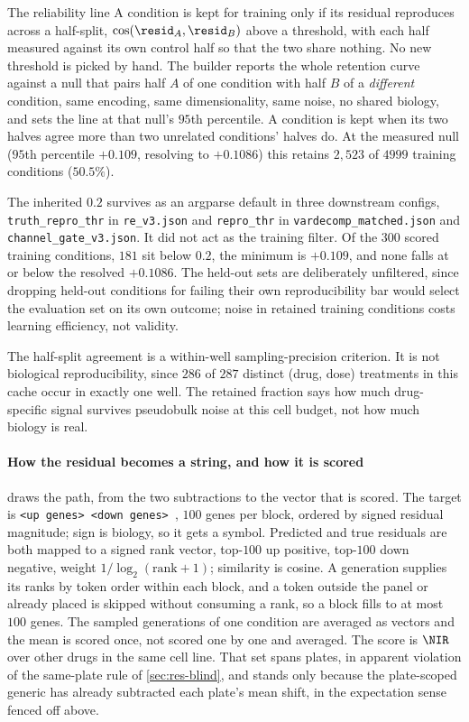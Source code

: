 \begin{defn}{The reliability line}
A condition is kept for training only if its residual reproduces across a
half-split, $\cos(\resid_A, \resid_B)$ above a threshold, with each half
measured against its own control half so that the two share nothing. No new
threshold is picked by hand. The builder reports the whole retention curve
against a null that pairs half $A$ of one condition with half $B$ of a
\emph{different} condition, same encoding, same dimensionality, same noise, no
shared biology, and sets the line at that null's $95$th percentile. A condition
is kept when its two halves agree more than two unrelated conditions' halves do.
At the measured null ($95$th percentile $+0.109$, resolving to $+0.1086$) this
retains $2{,}523$ of $\num{4999}$ training conditions ($50.5\%$).
\end{defn}

The inherited $0.2$ survives as an argparse default in three downstream configs,
\texttt{truth\_repro\_thr} in \texttt{re\_v3.json} and \texttt{repro\_thr} in
\texttt{vardecomp\_matched.json} and \texttt{channel\_gate\_v3.json}. It did not
act as the training filter. Of the $\num{300}$ scored training conditions,
$\num{181}$ sit below $0.2$, the minimum is $+0.109$, and none falls at or below
the resolved $+0.1086$. The held-out sets are deliberately unfiltered, since
dropping held-out conditions for failing their own reproducibility bar would
select the evaluation set on its own outcome; noise in retained training
conditions costs learning efficiency, not validity.

The half-split agreement is a within-well sampling-precision criterion. It is not
biological reproducibility, since $\num{286}$ of $\num{287}$ distinct (drug,
dose) treatments in this cache occur in exactly one well. The retained fraction
says how much drug-specific signal survives pseudobulk noise at this cell budget,
not how much biology is real.

\paragraph{How the residual becomes a string, and how it is scored}
 draws the path, from the two subtractions to the vector that is
scored. The target is \texttt{<up genes> \DOWN{} <down genes> \ENDCELL}, $100$
genes per block, ordered by signed residual magnitude; sign is biology, so it
gets a symbol.
Predicted and true residuals are both mapped to a signed rank vector, top-$100$
up positive, top-$100$ down negative, weight $1/\log_2(\textrm{rank}+1)$;
similarity is cosine. A generation supplies its ranks by token order within each
block, and a token outside the panel or already placed is skipped without
consuming a rank, so a block fills to at most $100$ genes. The sampled
generations of one condition are averaged as vectors and the mean is scored
once, not scored one by one and averaged.
The score is $\NIR$ over other drugs in the same cell line. That set
spans plates, in apparent violation of the same-plate rule of
\cref{sec:res-blind}, and stands only because the plate-scoped generic has
already subtracted each plate's mean shift, in the expectation sense fenced
off above.

